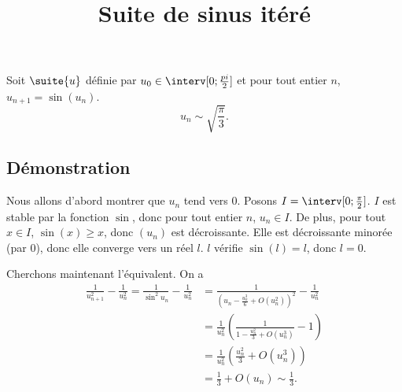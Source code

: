 \documentclass[fontsize=12pt,twoside=false,parskip=half, french]{scrartcl}
\title{Suite de sinus itéré}
\date{}
\author{}
\begin{document}
\maketitle
   \begin{Theoreme}
      Soit $\suite{u}$ définie par $u_0 \in \interv[0; \frac{pi}{2}]$ et pour tout entier $n$, $u_{n + 1} = \sin(u_n)$.
      \[
         u_n \sim \sqrt{\frac{\pi}{3}}.
      \]
   \end{Theoreme}
   \subsection{Démonstration}
      Nous allons d’abord montrer que $u_n$ tend vers 0. Posons $I = \interv[0; \frac{\pi}{2}]$.
      $I$ est stable par la fonction $\sin$, donc pour tout entier $n$, $u_n \in I$. De plus,
      pour tout $x \in I$, $\sin(x) \geq x$, donc $(u_n)$ est décroissante. Elle est 
      décroissante minorée (par $0$), donc elle converge vers un réel $l$. $l$ vérifie 
      $\sin(l) = l$, donc $l = 0$.
      
      Cherchons maintenant l’équivalent. On a 
      \begin{align*}
         \frac{1}{u_{n + 1}^2} - \frac{1}{u_n^2} = \frac{1}{\sin^2 u_n} - \frac{1}{u_n^2} &= \frac{1}{\left(u_n - \frac{u_n^3}{6} + O(u_n^2)\right)^2} - \frac{1}{u_n^2}\\
                                                 &= \frac{1}{u_n^2} \left( \frac{1}{1 - \frac{u_n^2}{3} + O(u_n^3)} - 1\right)\\
                                                 &= \frac{1}{u_n^2} \left( \frac{u_n^2}{3} + O(u_n^3) \right)\\
                                                 &= \frac{1}{3} + O(u_n) \sim \frac{1}{3}.                                                
      \end{align*}
      
\end{document}
